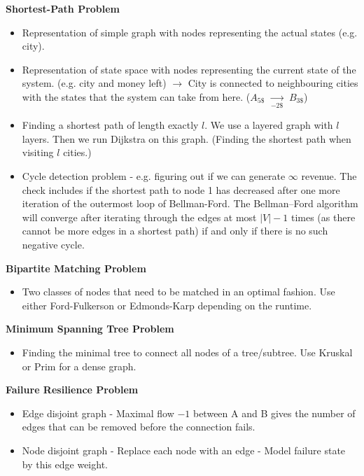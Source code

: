 \documentclass[9pt,landscape,a4paper, table]{extarticle}
\begin{document}
\begin{multicols*}{3}
\textbf{Shortest-Path Problem}
\begin{itemize}
    \item Representation of simple graph with nodes representing the actual states (e.g. city).
    \item Representation of state space with nodes representing the current state of the system. (e.g. city and money left) $\rightarrow$ City is connected to neighbouring cities with the states that the system can take from here. ($A_{5\$}$ $\underset{-2\$}{\rightarrow}$ $B_{3\$}$)
    \item Finding a shortest path of length exactly $l$. We use a layered graph with $l$ layers. Then we run Dijkstra on this graph. (Finding the shortest path when visiting $l$ cities.)
    \item Cycle detection problem - e.g. figuring out if we can generate $\infty$ revenue. The check includes if the shortest path to node 1 has decreased after one more iteration of the outermost loop of Bellman-Ford. The Bellman–Ford algorithm will converge after iterating through the edges at most $| V | -1$ times (as there cannot be more edges in a shortest path) if and only if there is no such negative cycle.
\end{itemize}

\textbf{Bipartite Matching Problem}
\begin{itemize}
    \item Two classes of nodes that need to be matched in an optimal fashion. Use either Ford-Fulkerson or Edmonds-Karp depending on the runtime. 
\end{itemize}

\textbf{Minimum Spanning Tree Problem}

\begin{itemize}
    \item Finding the minimal tree to connect all nodes of a tree/subtree. Use Kruskal or Prim for a dense graph. 
\end{itemize}

\textbf{Failure Resilience Problem}

\begin{itemize}
    \item Edge disjoint graph - Maximal flow $- 1$ between A and B gives the number of edges that can be removed before the connection fails. 
    \item Node disjoint graph - Replace each node with an edge - Model failure state by this edge weight. 
\end{itemize}


\end{multicols*}
\end{document}
